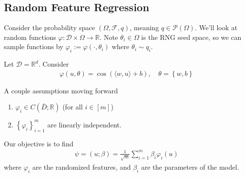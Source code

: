 \documentclass[11pt,fleqn]{article}
\numberwithin{equation}{section}
\theoremstyle{definition}
\theoremstyle{definition}
\begin{document}
\subsection{Random Feature Regression} Consider the probability space $(\Omega, \mathcal F, q)$, meaning $q \in \mathcal P(\Omega)$. We'll look at random functions $\varphi: \mathcal D \times \Omega \to \mathbb R$. Note $\theta_i \in \Omega$ is the RNG seed space, so we can sample functions by $\varphi_i := \varphi(\cdot, \theta_i)$ where $\theta_i \sim q_i$. 
\begin{eg}
	 Let $\mathcal D = \mathbb R^d$. Consider
	\begin{align}
		\varphi(u, \theta) = \cos(\langle w , u\rangle + b), \quad \theta = \left\{ w, b \right\} 
	\end{align}
\end{eg}
A couple assumptions moving forward
\begin{enumerate}
	\item $\varphi_i \in C(\bar D ; \mathbb R)$ (for all $i \in [m]$)
	\item $\left\{ \varphi_i \right\}_{i=1}^m$ are linearly independent.
\end{enumerate}
Our objective is to find
\begin{align}
	\psi = (u ; \beta) = \frac{1}{\sqrt{m}} \sum_{i=1}^m \beta_i \varphi_i(u) \label{eqn:RandomFeature_Ansatz}
\end{align}  
where $\varphi_i$ are the randomized features, and $\beta_i$ are the parameters of the model.
\end{document}
